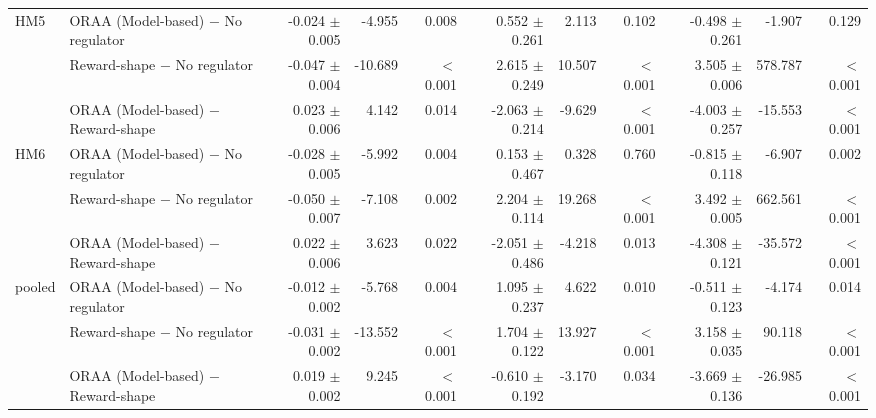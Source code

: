 \begin{tabular}{llrrrrrrrrr}
\addlinespace
HM5 & ORAA (Model-based) $-$ No regulator & -0.024 $\pm$ 0.005 & -4.955 & 0.008 & 0.552 $\pm$ 0.261 & 2.113 & 0.102 & -0.498 $\pm$ 0.261 & -1.907 & 0.129 \\
 & Reward-shape $-$ No regulator & -0.047 $\pm$ 0.004 & -10.689 & $<$0.001 & 2.615 $\pm$ 0.249 & 10.507 & $<$0.001 & 3.505 $\pm$ 0.006 & 578.787 & $<$0.001 \\
 & ORAA (Model-based) $-$ Reward-shape & 0.023 $\pm$ 0.006 & 4.142 & 0.014 & -2.063 $\pm$ 0.214 & -9.629 & $<$0.001 & -4.003 $\pm$ 0.257 & -15.553 & $<$0.001 \\
\addlinespace
HM6 & ORAA (Model-based) $-$ No regulator & -0.028 $\pm$ 0.005 & -5.992 & 0.004 & 0.153 $\pm$ 0.467 & 0.328 & 0.760 & -0.815 $\pm$ 0.118 & -6.907 & 0.002 \\
 & Reward-shape $-$ No regulator & -0.050 $\pm$ 0.007 & -7.108 & 0.002 & 2.204 $\pm$ 0.114 & 19.268 & $<$0.001 & 3.492 $\pm$ 0.005 & 662.561 & $<$0.001 \\
 & ORAA (Model-based) $-$ Reward-shape & 0.022 $\pm$ 0.006 & 3.623 & 0.022 & -2.051 $\pm$ 0.486 & -4.218 & 0.013 & -4.308 $\pm$ 0.121 & -35.572 & $<$0.001 \\
\addlinespace
pooled & ORAA (Model-based) $-$ No regulator & -0.012 $\pm$ 0.002 & -5.768 & 0.004 & 1.095 $\pm$ 0.237 & 4.622 & 0.010 & -0.511 $\pm$ 0.123 & -4.174 & 0.014 \\
 & Reward-shape $-$ No regulator & -0.031 $\pm$ 0.002 & -13.552 & $<$0.001 & 1.704 $\pm$ 0.122 & 13.927 & $<$0.001 & 3.158 $\pm$ 0.035 & 90.118 & $<$0.001 \\
 & ORAA (Model-based) $-$ Reward-shape & 0.019 $\pm$ 0.002 & 9.245 & $<$0.001 & -0.610 $\pm$ 0.192 & -3.170 & 0.034 & -3.669 $\pm$ 0.136 & -26.985 & $<$0.001 \\
\bottomrule
\end{tabular}
